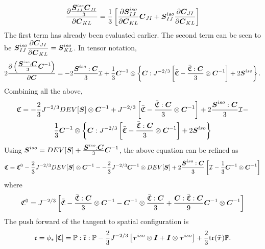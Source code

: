 \documentclass[11pt,twoside,TimesRoman]{article}
\newcommand{\parder}[2]{{\dfrac{\partial #1}{\partial #2}}}
\begin{document}
\begin{gather}
 	\parder{\frac{\bfS^{iso}_{IJ}\bfC_{JI}}{3}}{\bfC_{KL}} = \frac{1}{3} \left[  \parder{\bfS^{iso}_{IJ}}{\bfC_{KL}} \bfC_{JI} +  \bfS^{iso}_{IJ}  \parder{\bfC_{JI}}{\bfC_{KL}}   \right] 
\end{gather}
The first term has already been evaluated earlier. The second term can be seen to be $\bfS^{iso}_{IJ}  \parder{\bfC_{JI}}{\bfC_{KL}} = \bfS^{iso}_{KL}$. In tensor notation,
\begin{equation}
2\parder{\left( \frac{\bfS^{iso}:\bfC}{3}\bfC^{-1} \right)}{\bfC} = -2\frac{\bfS^{iso}:\bfC}{3} \mathcal{I}  + \frac{1}{3} \bfCinv \otimes \left\lbrace   \bfC:J^{-2/3} \left[\bar{\mathfrak{C}} - \frac{\bar{\mathfrak{C}}:\bfC}{3}\otimes\bfCinv  \right]  + 2\bfS^{iso}       \right\rbrace.
\end{equation}
Combining all the above,
\begin{multline}
\mathfrak{C} = -\frac{2}{3} J^{-2/3} DEV[\mbox{\boldmath $S$}]  \otimes {\mbox{\boldmath $C$}^{-1}} + J^{-2/3}\left[\bar{\mathfrak{C}}- \frac{\bar{\mathfrak{C}}: \mbox{\boldmath $C$}}{3}  \otimes \mbox{\boldmath $C$}^{-1} \right] +2\frac{\mbox{\boldmath $S$}^{iso}:\mbox{\boldmath $C$}}{3} \mathcal{I}  - \\
\frac{1}{3} {\mbox{\boldmath $C$}}^{-1} \otimes \left\lbrace   \mbox{\boldmath $C$}:J^{-2/3} \left[\bar{\mathfrak{C}} - \frac{\bar{\mathfrak{C}}:\mbox{\boldmath $C$}}{3}\otimes{\mbox{\boldmath $C$}}^{-1}  \right]  + 2 \mbox{\boldmath $S$}^{iso}       \right\rbrace
\end{multline}
Using $\mbox{\boldmath $S$}^{iso} = DEV[\mbox{\boldmath $S$}] + \frac{\mbox{\boldmath $S$}^{iso}:\mbox{\boldmath $C$}}{3} {\mbox{\boldmath $C$}}^{-1}$, the above equation can be refined as 
\begin{multline}
\mathfrak{C} = \mathfrak{C}^0-\frac{2}{3} J^{-2/3} DEV[\mbox{\boldmath $S$}]  \otimes {\mbox{\boldmath $C$}}^{-1} - -\frac{2}{3}J^{-2/3} {\mbox{\boldmath $C$}}^{-1} \otimes  DEV[\mbox{\boldmath $S$}]  + 
2\frac{\mbox{\boldmath $S$}^{iso}:\mbox{\boldmath $C$}}{3}\left[ \mathcal{I} - \frac{1}{3} {\mbox{\boldmath $C$}}^{-1} \otimes {\mbox{\boldmath $C$}}^{-1} \right]
\end{multline}
where
\begin{equation}
\mathfrak{C}^0=   J^{-2/3}\left[\bar{\mathfrak{C}} - \frac{\bar{\mathfrak{C}}: \mbox{\boldmath $C$}}{3}  \otimes \mbox{\boldmath $C$}^{-1} - {\mbox{\boldmath $C$}}^{-1} \otimes \frac{\bar{\mathfrak{C}}: \mbox{\boldmath $C$}}{3} + \frac{\mbox{\boldmath $C$}:\bar{\mathfrak{C}} :\mbox{\boldmath $C$}}{9}  {\mbox{\boldmath $C$}}^{-1} \otimes {\mbox{\boldmath $C$}}^{-1} \right] 
\end{equation}
The push forward of the tangent to spatial configuration is
\begin{equation}
 \mathfrak{c} = \phi_* \left[\mathfrak{C} \right] =  \mathbb{P}:\bar{\mathfrak{c}}:\mathbb{P} - \frac{2}{3} J^{-2/3} \left[{\mbox{\boldmath $\tau$}}^{iso} \otimes \mbox{\boldmath $I$}  +\mbox{\boldmath $I$} \otimes  {\mbox{\boldmath $\tau$}}^{iso} \right] + \frac{2}{3} \text{tr}(\bar{\mbox{\boldmath $\tau$}}) \mathbb{P}.
\end{equation}
\end{document}
